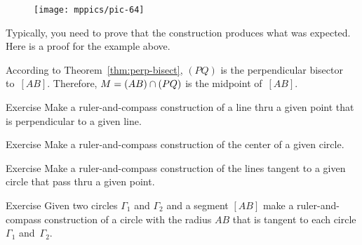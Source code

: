\begin{figure}[h!]
\centering
\texttt{[image: mppics/pic-64]}
\end{figure}

Typically, you need to prove that the construction produces what was expected. Here is a proof for the example above.

According to Theorem~\ref{thm:perp-bisect}, $(PQ)$ is the perpendicular bisector to~$[AB]$.
Therefore, $M\z=(AB)\cap(PQ)$ is the midpoint of~$[AB]$. 
\qeds



\begin{thm}{Exercise}\label{ex:construction-perpendicular}
Make a ruler-and-compass construction of a line thru a given point that is perpendicular to a given line.
\end{thm}

\begin{thm}{Exercise}\label{ex:center}
Make a ruler-and-compass construction of the center 
of a given circle.
\end{thm}

\begin{thm}{Exercise}\label{ex:tangent}
Make a ruler-and-compass construction of the lines tangent to a given circle that pass thru a given point.
\end{thm}

\begin{thm}{Exercise}\label{ex:tangent-circle}
Given two circles $\Gamma_1$ and $\Gamma_2$ and a segment $[AB]$
make a ruler-and-compass construction of a circle with the radius $AB$ 
that is tangent to each circle $\Gamma_1$ and~$\Gamma_2$.
\end{thm}


